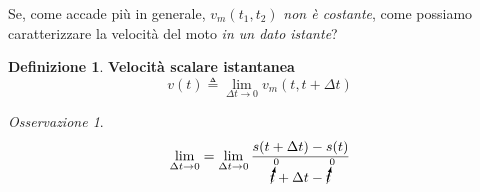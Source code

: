 \documentclass[a4paper, 12pt]{report}
\theoremstyle{definition}
\newtheorem{definition}{Definizione}[section]
\theoremstyle{remark}
\newtheorem*{remark}{Osservazione}
\theoremstyle{plain}
\begin{document}
Se, come accade più in generale, $v_m(t_1, t_2)$ {\it non è costante}, come possiamo caratterizzare la velocità del moto {\it in un dato istante}?

\begin{definition}
    {\bf Velocità scalare istantanea}
    \begin{equation}
        v(t) \triangleq \lim_{\Delta t \to 0} v_m(t, t + \Delta t)  
    \end{equation}
\end{definition}

\begin{remark}
    \begin{equation}
        \lim_{\Delta t \to 0} = \lim_{\Delta t \to 0} \frac{s(t + \Delta t) - s(t)}{\cancelto{0}{t} + \Delta t - \cancelto{0}{t}}
    \end{equation}
\end{remark}
\end{document}

